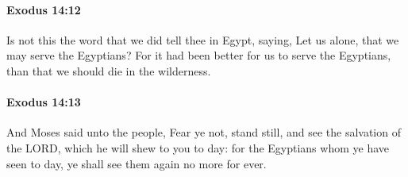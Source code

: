		\paragraph{Exodus 14:12} %
			\label{EXODUS-14-12}

			Is not this the word that we did tell thee in Egypt, saying, Let us alone, that we may serve the Egyptians? For it had been better for us to serve the Egyptians, than that we should die in the wilderness.


		\paragraph{Exodus 14:13} %
			\label{EXODUS-14-13}

			And Moses said unto the people, Fear ye not, stand still, and see the salvation of the LORD, which he will shew to you to day: for the Egyptians whom ye have seen to day, ye shall see them again no more for ever.

